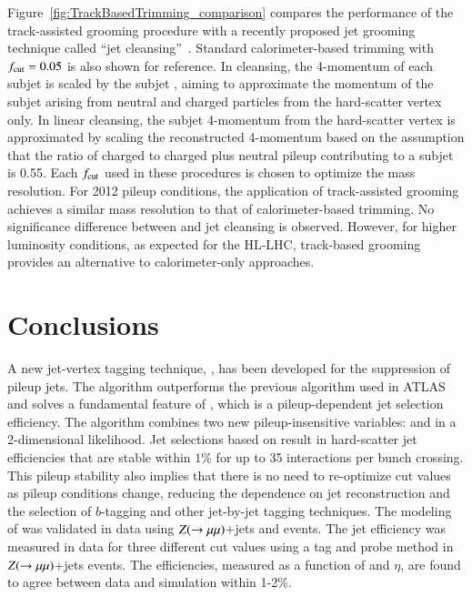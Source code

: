 \documentclass{atlasnote}
\begin{document}
Figure~\ref{fig:TrackBasedTrimming_comparison} compares the performance of the track-assisted grooming procedure with a recently proposed 
jet grooming technique called ``jet cleansing''~\cite{Krohn:2013lba}. Standard calorimeter-based trimming with
$f_{\rm cut}=0.05$ is also shown for reference. 
In \JVF cleansing, the 4-momentum of each subjet is scaled by the subjet \JVF, aiming to approximate 
the momentum of the subjet arising from neutral and charged particles from the hard-scatter vertex only. In linear cleansing, 
the subjet 4-momentum from the hard-scatter vertex is approximated by scaling the reconstructed 4-momentum based on the assumption that the
ratio of charged to charged plus neutral pileup \pT contributing to a subjet is 0.55. 
Each $f_{\rm cut}$ used in these procedures is chosen to optimize the mass resolution. 
For 2012 pileup conditions, the application of track-assisted grooming achieves a similar mass resolution to that of calorimeter-based trimming. No
significance difference between \cJVF and jet cleansing is observed. However, for higher luminosity conditions, as expected for the HL-LHC, 
track-based grooming provides an alternative to calorimeter-only approaches. 

\section{Conclusions}
\label{sec:concl}
 
A new jet-vertex tagging technique, \JVT, has been developed for the suppression of pileup jets. The \JVT algorithm outperforms the previous
\JVF algorithm used in ATLAS and solves a fundamental feature of \JVF, which is a pileup-dependent jet selection efficiency. 
The \JVT algorithm combines two new pileup-insensitive variables: \cJVF and \RpT in a 2-dimensional likelihood.
Jet selections based on \JVT result in hard-scatter jet efficiencies that are stable within $1\%$ for up to 35 interactions per bunch crossing. 
This pileup stability also implies that there is no need to re-optimize \JVT cut values as pileup conditions change, reducing the dependence on 
jet reconstruction and the selection 
of $b$-tagging and other jet-by-jet tagging techniques. 
The modeling of \JVT was validated in data using $Z(\rightarrow\mu\mu)$+jets and \ttbar events. The jet efficiency was measured 
in data for three different \JVT cut values using a tag and probe method in  $Z(\rightarrow\mu\mu)$+jets events. The efficiencies, measured as a function of 
\pT and $\eta$,
are found to agree between data and simulation within 1-2\%. 
\end{document}
